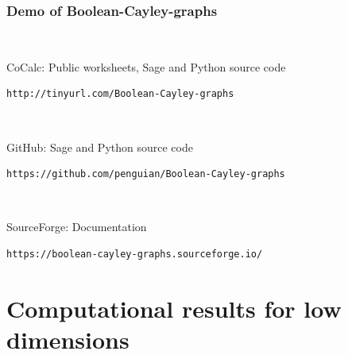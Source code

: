 \documentclass[pdf,sprung,slideColor,nocolorBG]{beamer}
\newenvironment{colortheme}[1]{
\def\ProvidesPackageRCS $##1${\relax}
\renewcommand{\ProcessOptions}{\relax}
\makeatletter

\makeatother
}{}
\begin{document}
\begin{colortheme}{access}

\begin{frame}[fragile]
\frametitle{Demo of Boolean-Cayley-graphs}

~

CoCalc: Public worksheets, Sage and Python source code
\begin{verbatim}
http://tinyurl.com/Boolean-Cayley-graphs
\end{verbatim}

~

GitHub: Sage and Python source code
\begin{verbatim}
https://github.com/penguian/Boolean-Cayley-graphs
\end{verbatim}

~

SourceForge: Documentation
\begin{verbatim}
https://boolean-cayley-graphs.sourceforge.io/
\end{verbatim}

\end{frame}
\end{colortheme}

\section{Computational results for low dimensions}
\end{document}
